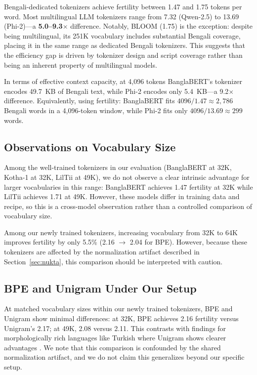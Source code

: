 \documentclass[11pt,a4paper]{article}
\begin{document}
Bengali-dedicated tokenizers achieve fertility between 1.47 and 1.75 tokens per word.
Most multilingual LLM tokenizers range from 7.32 (Qwen-2.5) to 13.69 (Phi-2)---a \textbf{5.0--9.3$\times$} difference.
Notably, BLOOM (1.75) is the exception: despite being multilingual, its 251K vocabulary includes substantial Bengali coverage, placing it in the same range as dedicated Bengali tokenizers.
This suggests that the efficiency gap is driven by tokenizer design and script coverage rather than being an inherent property of multilingual models.

In terms of effective context capacity, at 4,096 tokens BanglaBERT's tokenizer encodes 49.7~KB of Bengali text, while Phi-2 encodes only 5.4~KB---a 9.2$\times$ difference.
Equivalently, using fertility: BanglaBERT fits $4096/1.47 \approx 2{,}786$ Bengali words in a 4,096-token window, while Phi-2 fits only $4096/13.69 \approx 299$ words.

\subsection{Observations on Vocabulary Size}

Among the well-trained tokenizers in our evaluation (BanglaBERT at 32K, Kotha-1 at 32K, LilTii at 49K), we do not observe a clear intrinsic advantage for larger vocabularies in this range: BanglaBERT achieves 1.47 fertility at 32K while LilTii achieves 1.71 at 49K. However, these models differ in training data and recipe, so this is a cross-model observation rather than a controlled comparison of vocabulary size.

Among our newly trained tokenizers, increasing vocabulary from 32K to 64K improves fertility by only 5.5\% (2.16 $\rightarrow$ 2.04 for BPE).
However, because these tokenizers are affected by the normalization artifact described in Section~\ref{sec:nukta}, this comparison should be interpreted with caution.

\subsection{BPE and Unigram Under Our Setup}

At matched vocabulary sizes within our newly trained tokenizers, BPE and Unigram show minimal differences: at 32K, BPE achieves 2.16 fertility versus Unigram's 2.17; at 49K, 2.08 versus 2.11.
This contrasts with findings for morphologically rich languages like Turkish where Unigram shows clearer advantages \cite{toraman2023impact}.
We note that this comparison is confounded by the shared normalization artifact, and we do not claim this generalizes beyond our specific setup.
\end{document}
